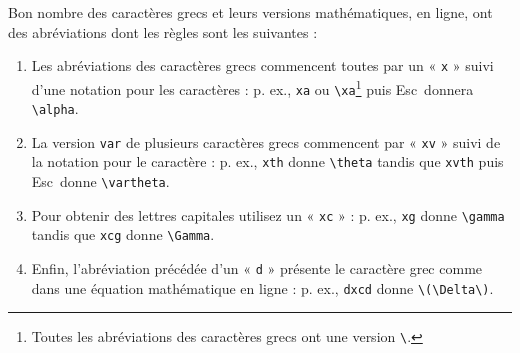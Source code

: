 \documentclass[11pt,french]{article}
\newcommand{\esckey}{\textsf{Esc}}
\newcommand{\selmark}{\colorbox{green}{\rule[-0.5ex]{0ex}{2.1ex}\texttt{•}}}
\begin{document}

Bon nombre des caractères grecs et leurs versions mathématiques, en ligne, ont des abréviations dont les règles 
sont les suivantes :
\begin{enumerate}
\item Les abréviations des caractères grecs commencent toutes par un « \texttt{x} » suivi d'une notation pour les 
caractères : p. ex., \verb|xa| ou \verb|\xa|\footnote{Toutes les abréviations des caractères grecs ont une 
version \texttt{\textbackslash}.} puis \esckey\ donnera \verb|\alpha|.
\item La version \texttt{var} de plusieurs caractères grecs commencent par « \texttt{xv} » suivi de la notation 
pour le caractère : p. ex., \texttt{xth} donne \verb|\theta| tandis que \verb|xvth| puis \esckey\ donne \verb|\vartheta|.
\item Pour obtenir des lettres capitales utilisez un « \texttt{xc} » : p. ex., \verb|xg| donne \verb|\gamma| tandis que \verb|xcg| donne \verb|\Gamma|.
\item Enfin, l'abréviation précédée d'un « \texttt{d} » présente le caractère grec comme dans une équation 
mathématique en ligne : p. ex., \verb|dxcd| donne \verb|\(\Delta\)|.
\end{enumerate}
\end{document}

